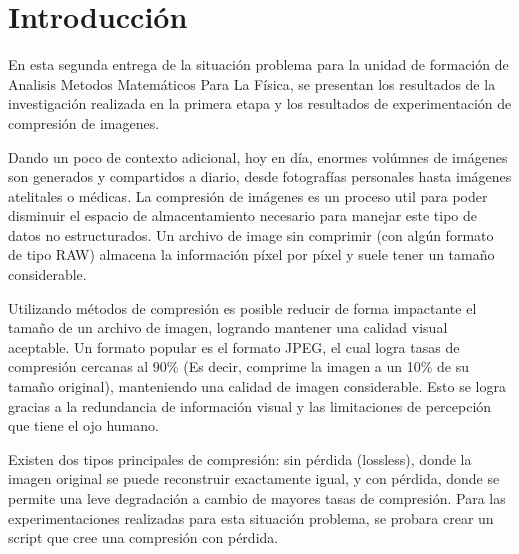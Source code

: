 \section{Introducción}

En esta segunda entrega de la situación problema para la unidad de formación de Analisis Metodos Matemáticos Para La Física,
se presentan los resultados de la investigación realizada en la primera etapa y los resultados de experimentación de compresión de imagenes.

Dando un poco de contexto adicional, hoy en día, enormes volúmnes de imágenes son generados y compartidos a diario, desde fotografías personales hasta imágenes atelitales o médicas.
La compresión de imágenes es un proceso util para poder disminuir el espacio de almacentamiento necesario para manejar este tipo de datos no estructurados. 
Un archivo de image sin comprimir (con algún formato de tipo RAW) almacena la información píxel por píxel y suele tener un tamaño considerable. 

Utilizando métodos de compresión es posible reducir de forma impactante el tamaño de un archivo de imagen, logrando mantener una calidad visual aceptable. Un formato popular es el formato JPEG, el cual logra tasas de compresión cercanas al 90\% (Es decir, comprime la imagen a un 10\% de su tamaño original), manteniendo una calidad de imagen considerable.
Esto se logra gracias a la redundancia de información visual y las limitaciones de percepción que tiene el ojo humano.

Existen dos tipos principales de compresión: sin pérdida (lossless), donde la imagen original se puede reconstruir exactamente igual, y con pérdida, donde se permite una leve degradación a cambio de mayores tasas de compresión.
Para las experimentaciones realizadas para esta situación problema, se probara crear un script que cree una compresión con pérdida.